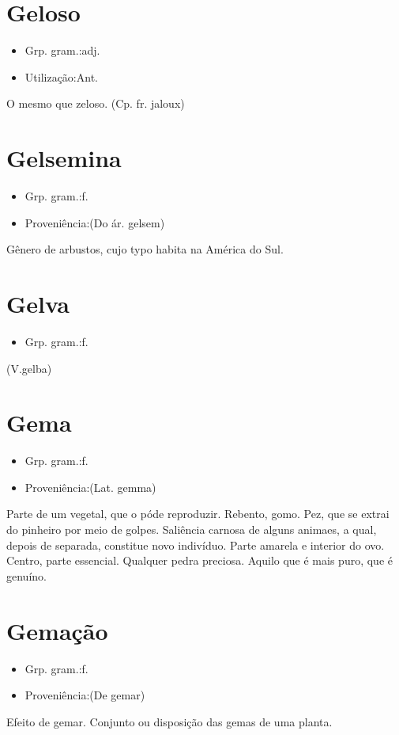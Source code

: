 \section{Geloso}
\begin{itemize}
\item {Grp. gram.:adj.}
\end{itemize}
\begin{itemize}
\item {Utilização:Ant.}
\end{itemize}
O mesmo que \textunderscore zeloso\textunderscore .
(Cp. fr. \textunderscore jaloux\textunderscore )
\section{Gelsemina}
\begin{itemize}
\item {Grp. gram.:f.}
\end{itemize}
\begin{itemize}
\item {Proveniência:(Do ár. \textunderscore gelsem\textunderscore )}
\end{itemize}
Gênero de arbustos, cujo typo habita na América do Sul.
\section{Gelva}
\begin{itemize}
\item {Grp. gram.:f.}
\end{itemize}
(V.gelba)
\section{Gema}
\begin{itemize}
\item {Grp. gram.:f.}
\end{itemize}
\begin{itemize}
\item {Proveniência:(Lat. \textunderscore gemma\textunderscore )}
\end{itemize}
Parte de um vegetal, que o póde reproduzir.
Rebento, gomo.
Pez, que se extrai do pinheiro por meio de golpes.
Saliência carnosa de alguns animaes, a qual, depois de separada, constitue novo indivíduo.
Parte amarela e interior do ovo.
Centro, parte essencial.
Qualquer pedra preciosa.
Aquilo que é mais puro, que é genuíno.
\section{Gemação}
\begin{itemize}
\item {Grp. gram.:f.}
\end{itemize}
\begin{itemize}
\item {Proveniência:(De \textunderscore gemar\textunderscore )}
\end{itemize}
Efeito de gemar.
Conjunto ou disposição das gemas de uma planta.
